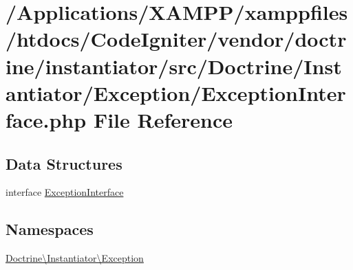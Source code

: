 \hypertarget{doctrine_2instantiator_2src_2_doctrine_2_instantiator_2_exception_2_exception_interface_8php}{}\section{/\+Applications/\+X\+A\+M\+P\+P/xamppfiles/htdocs/\+Code\+Igniter/vendor/doctrine/instantiator/src/\+Doctrine/\+Instantiator/\+Exception/\+Exception\+Interface.php File Reference}
\label{doctrine_2instantiator_2src_2_doctrine_2_instantiator_2_exception_2_exception_interface_8php}
\subsection*{Data Structures}
\begin{DoxyCompactItemize}
\item 
interface \mbox{\hyperlink{interface_doctrine_1_1_instantiator_1_1_exception_1_1_exception_interface}{Exception\+Interface}}
\end{DoxyCompactItemize}
\subsection*{Namespaces}
\begin{DoxyCompactItemize}
\item 
 \mbox{\hyperlink{namespace_doctrine_1_1_instantiator_1_1_exception}{Doctrine\textbackslash{}\+Instantiator\textbackslash{}\+Exception}}
\end{DoxyCompactItemize}
